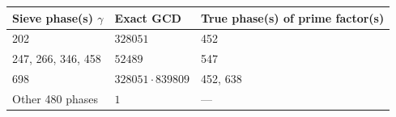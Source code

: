 \begin{tabular}{@{}lll@{}}\toprule
Sieve phase(s) $\gamma$ & Exact GCD & True phase(s) of prime factor(s)\\\midrule
202 & $328051$ & 452\\
247, 266, 346, 458 & $52489$ & 547\\
698 & $328051\cdot839809$ & 452, 638\\
Other 480 phases & $1$ & ---\\\bottomrule
\end{tabular}
